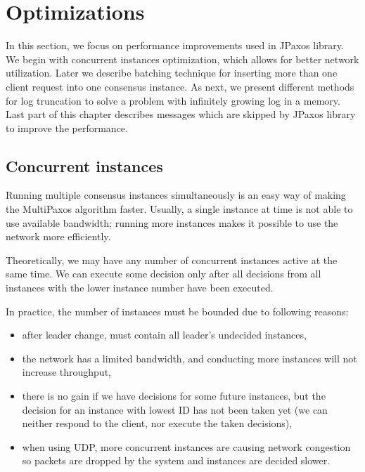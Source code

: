 \chapter{Optimizations}

In this section, we focus on performance improvements used in JPaxos library. We begin with concurrent instances optimization, which allows for better network utilization. Later we describe batching technique for inserting more than one client request into one consensus instance. As next, we present different methods for log truncation to solve a problem with infinitely growing log in a memory. Last part of this chapter describes messages which are skipped by JPaxos library to improve the performance.

\section{Concurrent instances}
\label{subsec:concurrent_instances}
Running multiple consensus instances simultaneously is an easy way of making the MultiPaxos algorithm faster. Usually, a single instance at time is not able to use available bandwidth; running more instances makes it possible to use the network more efficiently.

Theoretically, we may have any number of concurrent instances active at the same time. We can execute some decision only after all decisions from all instances with the lower instance number have been executed.

In practice, the number of instances must be bounded due to following reasons:
\begin{itemize} 
  \item after leader change, \prepareOK must contain all leader's undecided instances,
  \item the network has a limited bandwidth, and conducting more instances will not increase throughput,
  \item there is no gain if we have decisions for some future instances, but the decision for an instance with lowest ID has not been taken yet (we can neither respond to the client, nor execute the taken decisions),
  \item when using UDP, more concurrent instances are causing network congestion so packets are dropped by the system and instances are decided slower.
\end{itemize}

